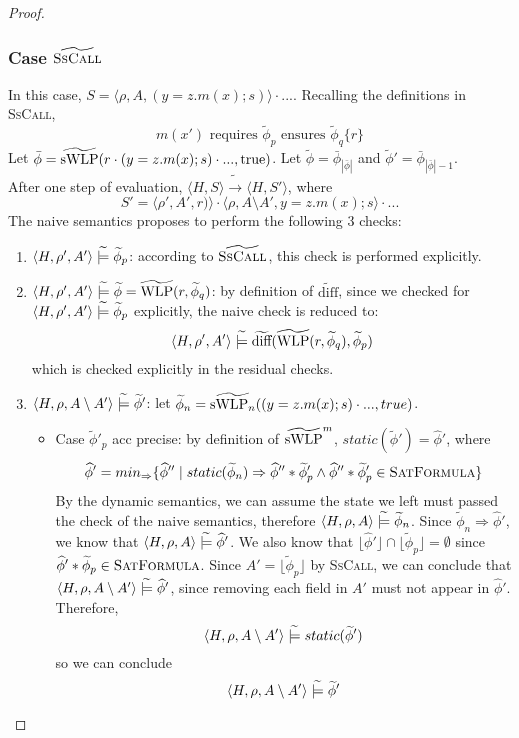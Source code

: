 \documentclass {article}
\newcommand{\true}{\text{true}}
\newcommand{\fphi}{\widehat{\phi}}
\newcommand{\tphi}{\widetilde{\phi}}
\newcommand{\imp}{\Rightarrow}
\newcommand{\tconsistent}{\hspace{1mm}\widetilde{\models}\hspace{1mm}}
\newcommand{\twlp}[2]{\widetilde{\textup{WLP}}(#1,#2)}
\newcommand{\tswlp}[2]{\widetilde{\textup{sWLP}}(#1,#2)}
\newcommand{\tswlpn}[2]{\widetilde{\textup{sWLP}_n}(#1,#2)}
\newcommand{\tdiff}[2]{\widetilde{\textup{diff}}(#1,#2)}
\newcommand{\satdef}{\textsc{SatFormula}}
\begin{document}
\begin{proof}
\subsubsection*{Case $\widetilde{\textsc{SsCall}}$}
In this case, $S = \langle \rho, A, (y = z.m(x); s)\rangle \cdot ...$. Recalling the definitions in \textsc{SsCall}, $$m(x′) \text{ requires } \tphi_p \text{ ensures } \tphi_q \{ r \}$$ 
Let $\bar{\phi}  = \tswlp{r \cdot (y = z.m(x);s) \cdot ...}{\true}$. Let $\tphi = \bar{\phi} _{|\bar{\phi} |}$ and $\tphi' = \bar{\phi} _{|\bar{\phi} |-1}$.\\
After one step of evaluation, $\langle H,S \rangle \widetilde{\longrightarrow} \langle H,S' \rangle$, where $$S' =  \langle \rho', A', r) \rangle \cdot \langle \rho, A \setminus A', y = z.m(x); s\rangle \cdot ...$$
The naive semantics proposes to perform the following 3 checks:
\begin{enumerate}
    \item $\langle H, \rho', A'  \rangle \tconsistent \tphi_p$: according to $\widetilde{\textsc{SsCall}}$, this check is performed explicitly.\\ 
    \item $\langle H, \rho', A'  \rangle \tconsistent \tphi = \twlp{r}{\tphi_q}$: by definition of $\widetilde{\text{diff}}$, since we checked for $\langle H, \rho', A'  \rangle \tconsistent  \tphi_p$ explicitly, the naive check is reduced to:
$$\langle H, \rho', A'  \rangle \tconsistent \tdiff{\twlp{r}{\tphi_q}}{\tphi_p}$$which is checked explicitly in the residual checks.
    \item $\langle H, \rho, A \setminus A' \rangle \tconsistent \tphi'$: let $\tphi_n = \tswlpn{(y = z.m(x);s) \cdot ...}{true}$.\\
\begin{itemize}
    \item Case $\tphi'_p$ acc precise: by definition of $\widetilde{\textup{sWLP}}^m$, $static(\tphi') = \fphi'$, where $$\fphi' = min_{\imp}\{\fphi'' \mid static(\tphi_n) \imp \fphi'' \ast \tphi'_p \wedge \fphi'' \ast \tphi'_p \in \satdef\}$$ By the dynamic semantics, we can assume the state we left must passed the check of the naive semantics, therefore $\langle H, \rho, A \rangle \tconsistent \tphi_n$. Since $\tphi_n \imp \fphi'$, we know that $\langle H, \rho, A \rangle \tconsistent \fphi'$. We also know that $\lfloor \fphi' \rfloor \cap \lfloor \tphi_p \rfloor = \emptyset$ since $\fphi' \ast \tphi_p \in \satdef$. Since $A' = \lfloor \tphi_p \rfloor$ by \textsc{SsCall}, we can conclude that $\langle H, \rho, A \setminus A'\rangle \tconsistent \fphi'$, since removing each field in $A'$ must not appear in $\fphi'$. Therefore, $$\langle H, \rho, A \setminus A'\rangle \tconsistent static(\tphi')$$ so we can conclude $$\langle H, \rho, A \setminus A'\rangle \tconsistent \tphi'$$
    

\end{itemize}
\end{enumerate}
\end{proof}
\end{document}
